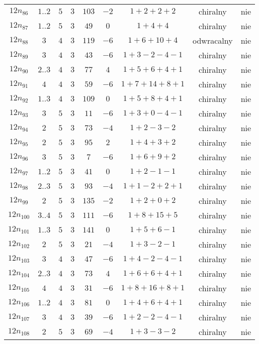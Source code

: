 \begin{longtable}{ccccccccc}
$12n_{86}$ & $1..2$ & $5$ & $3$ & $103$ & $-2$ & $1+2+2+2$ & chiralny & nie \\
$12n_{87}$ & $1..2$ & $5$ & $3$ & $49$ & $0$ & $1+4+4$ & chiralny & nie \\
$12n_{88}$ & $3$ & $4$ & $3$ & $119$ & $-6$ & $1+6+10+4$ & odwracalny & nie \\
$12n_{89}$ & $3$ & $4$ & $3$ & $43$ & $-6$ & $1+3-2-4-1$ & chiralny & nie \\
$12n_{90}$ & $2..3$ & $4$ & $3$ & $77$ & $4$ & $1+5+6+4+1$ & chiralny & nie \\
$12n_{91}$ & $4$ & $4$ & $3$ & $59$ & $-6$ & $1+7+14+8+1$ & chiralny & nie \\
$12n_{92}$ & $1..3$ & $4$ & $3$ & $109$ & $0$ & $1+5+8+4+1$ & chiralny & nie \\
$12n_{93}$ & $3$ & $5$ & $3$ & $11$ & $-6$ & $1+3+0-4-1$ & chiralny & nie \\
$12n_{94}$ & $2$ & $5$ & $3$ & $73$ & $-4$ & $1+2-3-2$ & chiralny & nie \\
$12n_{95}$ & $2$ & $5$ & $3$ & $95$ & $2$ & $1+4+3+2$ & chiralny & nie \\
$12n_{96}$ & $3$ & $5$ & $3$ & $7$ & $-6$ & $1+6+9+2$ & chiralny & nie \\
$12n_{97}$ & $1..2$ & $5$ & $3$ & $41$ & $0$ & $1+2-1-1$ & chiralny & nie \\
$12n_{98}$ & $2..3$ & $5$ & $3$ & $93$ & $-4$ & $1+1-2+2+1$ & chiralny & nie \\
$12n_{99}$ & $2$ & $5$ & $3$ & $135$ & $-2$ & $1+2+0+2$ & chiralny & nie \\
$12n_{100}$ & $3..4$ & $5$ & $3$ & $111$ & $-6$ & $1+8+15+5$ & chiralny & nie \\
$12n_{101}$ & $1..3$ & $5$ & $3$ & $141$ & $0$ & $1+5+6-1$ & chiralny & nie \\
$12n_{102}$ & $2$ & $5$ & $3$ & $21$ & $-4$ & $1+3-2-1$ & chiralny & nie \\
$12n_{103}$ & $3$ & $4$ & $3$ & $47$ & $-6$ & $1+4-2-4-1$ & chiralny & nie \\
$12n_{104}$ & $2..3$ & $4$ & $3$ & $73$ & $4$ & $1+6+6+4+1$ & chiralny & nie \\
$12n_{105}$ & $4$ & $4$ & $3$ & $31$ & $-6$ & $1+8+16+8+1$ & chiralny & nie \\
$12n_{106}$ & $1..2$ & $4$ & $3$ & $81$ & $0$ & $1+4+6+4+1$ & chiralny & nie \\
$12n_{107}$ & $3$ & $4$ & $3$ & $39$ & $-6$ & $1+2-2-4-1$ & chiralny & nie \\
$12n_{108}$ & $2$ & $5$ & $3$ & $69$ & $-4$ & $1+3-3-2$ & chiralny & nie \\

\end{longtable}
